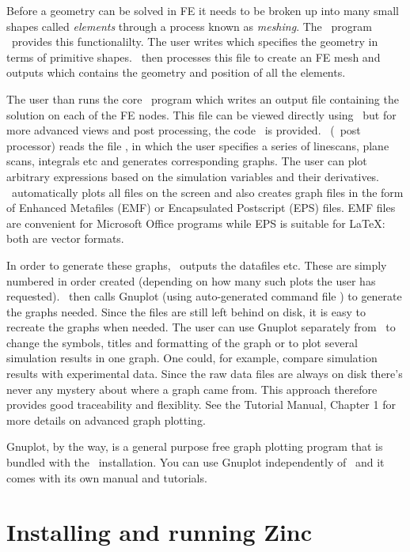 \documentclass[a4paper,twoside,11pt]{book}
\begin{document}
Before a geometry can be solved in FE it needs to be broken up into
many small shapes called \emph{elements} through a process known as
\emph{meshing}. The \zinc\ program \zmesh\ provides this
functionalilty. The user writes  which specifies the
geometry in terms of primitive shapes. \zmesh\ then processes this
file to create an FE mesh and outputs  which contains
the geometry and position of all the elements.

The user than runs the core \zinc\ program which writes an output file
 containing the solution on each of the FE nodes. This
file can be viewed directly using \zmesh\ but for more advanced views
and post processing, the code \zpp\ is provided. \zpp\ (\zinc\ post
processor) reads the file , in which the user specifies
a series of linescans, plane scans, integrals etc and generates corresponding
graphs. The user can plot arbitrary expressions based on the
simulation variables and their derivatives. \zpp\ automatically plots
all files on the screen and also creates graph files in the form of
Enhanced Metafiles (EMF) or Encapsulated Postscript (EPS) files. EMF
files are convenient for Microsoft Office programs while EPS is
suitable for \LaTeX: both are vector formats.

In order to generate these graphs, \zpp\ outputs the datafiles
 etc. These are simply numbered in
order created (depending on how many such plots the user has
requested). \zpp\ then calls Gnuplot \cite{gnuplot} (using
auto-generated command file ) to generate the graphs
needed. Since the  files are still left behind on disk, it
is easy to recreate the graphs when needed. The user can use Gnuplot
separately from \zinc\ to change the symbols, titles and formatting of
the graph or to plot several simulation results in one graph. One
could, for example, compare simulation results with experimental
data. Since the raw data files are always on disk there's never any
mystery about where a graph came from. This approach therefore
provides good traceability and flexiblity. See the Tutorial Manual,
Chapter 1 for more details on advanced graph plotting.

Gnuplot, by the way, is a general purpose free graph plotting program
that is bundled with the \zinc\ installation. You can use Gnuplot
independently of \zinc\ and it comes with its own manual and
tutorials.

\chapter{Installing and running Zinc}
\end{document}
